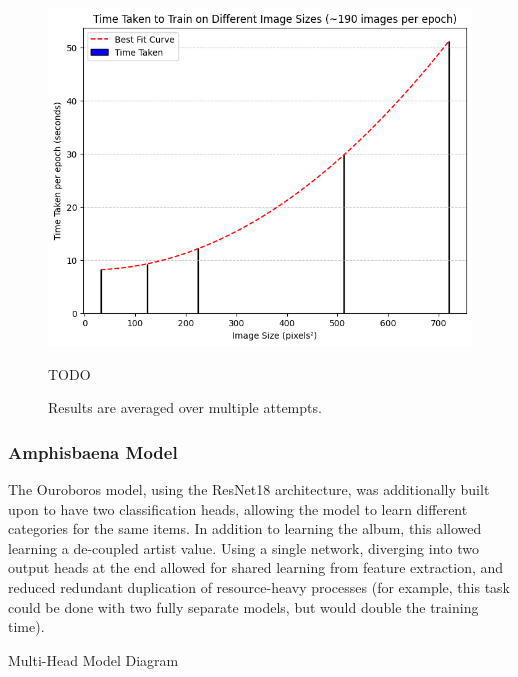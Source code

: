                         \begin{figure}[h]
                            \centering
                            \includegraphics[width=\textwidth]{images/CNNSize_Time.png}
                            \caption{TODO}
                            \label{fig:CNNSize_Time}
                            \caption*{Results are averaged over multiple attempts.}
                        \end{figure}
    
            \subsubsection{Amphisbaena Model}
    
                The Ouroboros model, using the ResNet18 architecture, was additionally built upon to have two classification heads, allowing the model to learn different categories for the same items. In addition to learning the album, this allowed learning a de-coupled artist value. Using a single network, diverging into two output heads at the end allowed for shared learning from feature extraction, and reduced redundant duplication of resource-heavy processes (for example, this task could be done with two fully separate models, but would double the training time).
    
                \begin{temp}
                    Multi-Head Model Diagram
                \end{temp}
    
